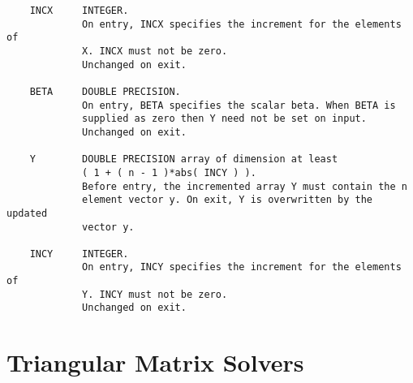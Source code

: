 \documentclass[10pt]{book}
\begin{document}
\begin{verbatim}
    INCX     INTEGER.
             On entry, INCX specifies the increment for the elements of
             X. INCX must not be zero.
             Unchanged on exit.

    BETA     DOUBLE PRECISION.
             On entry, BETA specifies the scalar beta. When BETA is
             supplied as zero then Y need not be set on input.
             Unchanged on exit.

    Y        DOUBLE PRECISION array of dimension at least
             ( 1 + ( n - 1 )*abs( INCY ) ).
             Before entry, the incremented array Y must contain the n
             element vector y. On exit, Y is overwritten by the updated
             vector y.

    INCY     INTEGER.
             On entry, INCY specifies the increment for the elements of
             Y. INCY must not be zero.
             Unchanged on exit.
\end{verbatim}

\newpage
\section{Triangular Matrix Solvers}

\newpage
\end{document}

